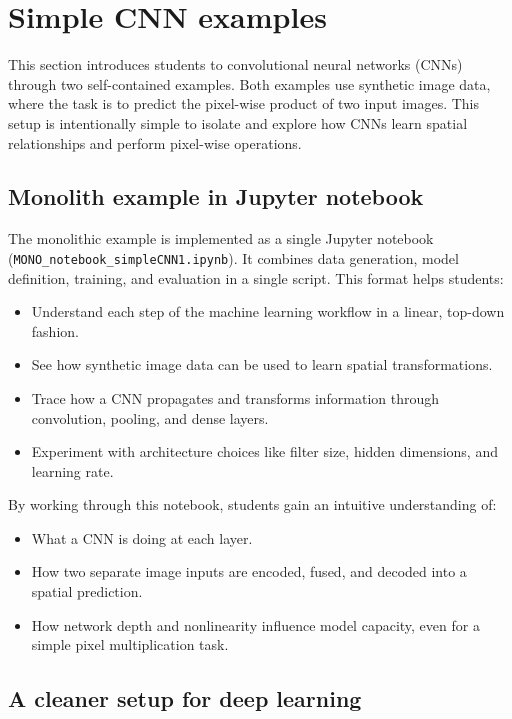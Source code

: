 \documentclass{article}
\begin{document}
\section{Simple CNN examples}
\label{sec:simple}

This section introduces students to convolutional neural networks (CNNs) through two self-contained examples. Both examples use synthetic image data, where the task is to predict the pixel-wise product of two input images. This setup is intentionally simple to isolate and explore how CNNs learn spatial relationships and perform pixel-wise operations.

\subsection{Monolith example in Jupyter notebook}
\label{sec:mono}

The monolithic example is implemented as a single Jupyter notebook (\texttt{MONO\_notebook\_simpleCNN1.ipynb}). It combines data generation, model definition, training, and evaluation in a single script. This format helps students:
\begin{itemize}
    \item Understand each step of the machine learning workflow in a linear, top-down fashion.
    \item See how synthetic image data can be used to learn spatial transformations.
    \item Trace how a CNN propagates and transforms information through convolution, pooling, and dense layers.
    \item Experiment with architecture choices like filter size, hidden dimensions, and learning rate.
\end{itemize}

By working through this notebook, students gain an intuitive understanding of:
\begin{itemize}
    \item What a CNN is doing at each layer.
    \item How two separate image inputs are encoded, fused, and decoded into a spatial prediction.
    \item How network depth and nonlinearity influence model capacity, even for a simple pixel multiplication task.
\end{itemize}

\subsection{A cleaner setup for deep learning}
\label{sec:clean}
\end{document}
